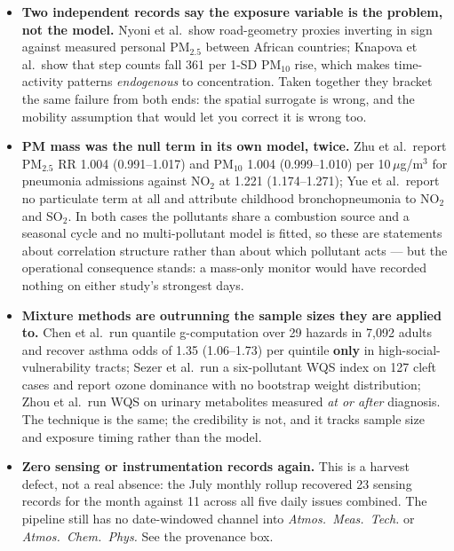 \documentclass[10pt]{article}
\begin{document}
\footnotesize
\begin{itemize}
\item \textbf{Two independent records say the exposure variable is the problem, not the
model.} Nyoni et al.\ show road-geometry proxies inverting in sign against measured
personal PM$_{2.5}$ between African countries; Knapova et al.\ show that step counts fall
361 per 1-SD PM$_{10}$ rise, which makes time-activity patterns \emph{endogenous} to
concentration. Taken together they bracket the same failure from both ends: the spatial
surrogate is wrong, and the mobility assumption that would let you correct it is wrong
too.

\item \textbf{PM mass was the null term in its own model, twice.} Zhu et al.\ report
PM$_{2.5}$ RR 1.004 (0.991--1.017) and PM$_{10}$ 1.004 (0.999--1.010) per
10\,$\mu$g/m$^3$ for pneumonia admissions against NO$_2$ at 1.221 (1.174--1.271); Yue
et al.\ report no particulate term at all and attribute childhood bronchopneumonia to
NO$_2$ and SO$_2$. In both cases the pollutants share a combustion source and a seasonal
cycle and no multi-pollutant model is fitted, so these are statements about correlation
structure rather than about which pollutant acts --- but the operational consequence
stands: a mass-only monitor would have recorded nothing on either study's strongest days.

\item \textbf{Mixture methods are outrunning the sample sizes they are applied to.}
Chen et al.\ run quantile g-computation over 29 hazards in 7{,}092 adults and recover
asthma odds of 1.35 (1.06--1.73) per quintile \textbf{only} in high-social-vulnerability
tracts; Sezer et al.\ run a six-pollutant WQS index on 127 cleft cases and report ozone
dominance with no bootstrap weight distribution; Zhou et al.\ run WQS on urinary
metabolites measured \emph{at or after} diagnosis. The technique is the same; the
credibility is not, and it tracks sample size and exposure timing rather than the model.

\item \textbf{Zero sensing or instrumentation records again.} This is a harvest defect,
not a real absence: the July monthly rollup recovered 23 sensing records for the month
against 11 across all five daily issues combined. The pipeline still has no date-windowed
channel into \textit{Atmos.\ Meas.\ Tech.} or \textit{Atmos.\ Chem.\ Phys.} See the
provenance box.
\end{itemize}
\end{document}
